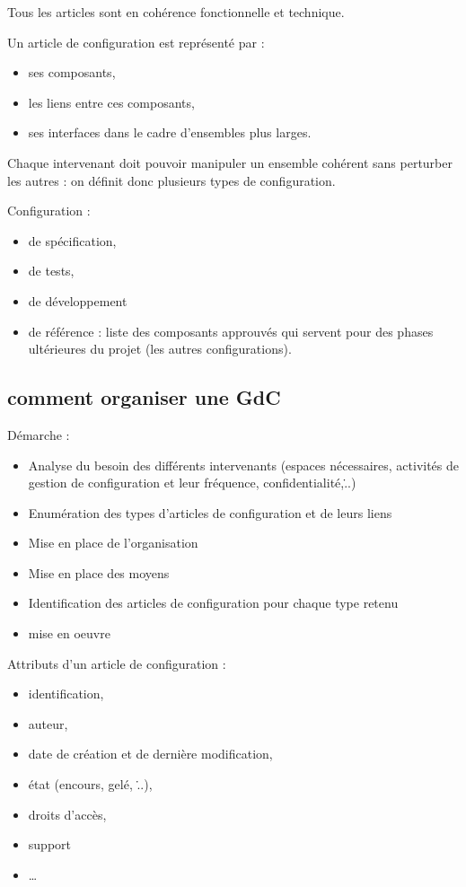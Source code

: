 Tous les articles sont en cohérence fonctionnelle et technique.

Un article de configuration est représenté par :

\begin{itemize}
	\item ses composants,
	\item les liens entre ces composants,
	\item ses interfaces dans le cadre d’ensembles plus larges.
\end{itemize}

Chaque intervenant doit pouvoir manipuler un ensemble cohérent sans perturber les autres : on définit donc plusieurs types de configuration.

Configuration :

\begin{itemize}
	\item de spécification,
	\item de tests,
	\item de développement
	\item de référence : liste des composants approuvés qui servent pour des phases ultérieures du projet (les autres configurations).
\end{itemize}

	\subsection{comment organiser une GdC}

Démarche :

	\begin{itemize}
	\item Analyse du besoin des différents intervenants (espaces nécessaires, activités de gestion de configuration et leur fréquence, confidentialité,\...)
	\item Enumération des types d’articles de configuration et de leurs liens
	\item Mise en place de l’organisation
	\item Mise en place des moyens
	\item Identification des articles de configuration pour chaque type retenu
	\item mise en oeuvre
	\end{itemize}

Attributs d’un article de configuration :

\begin{itemize}
	\item identification,
	\item auteur,
	\item date de création et de dernière modification,
	\item état (encours, gelé, \...),
	\item droits d’accès,
	\item support
	\item \ldots
\end{itemize}

